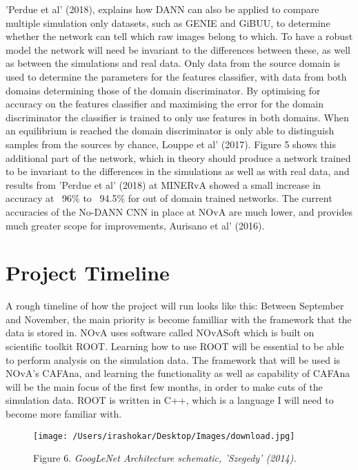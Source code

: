 \documentclass[11pt]{article}
\begin{document}
'Perdue et al' (2018), explains how DANN can also be applied to compare multiple simulation only datasets, such as GENIE and GiBUU, to determine whether the network can tell which raw images belong to which. To have a robust model the network will need be invariant to the differences between these, as well as between the simulations and real data. Only data from the source domain is used to determine the parameters for the features classifier, with data from both domains determining those of the domain discriminator. By optimising for accuracy on the features classifier and maximising the error for the domain discriminator the classifier is trained to only use features in both domains. When an equilibrium is reached the domain discriminator is only able to distinguish samples from the sources by chance, Louppe et al’ (2017). Figure 5 shows this additional part of the network, which in theory should produce a network trained to be invariant to the differences in the simulations as well as with real data, and results from 'Perdue et al' (2018) at MINERvA showed a small increase in accuracy at ~96\% to ~94.5\% for out of domain trained networks. The current accuracies of the No-DANN CNN in place at NOvA are much lower, and provides much greater scope for improvements, Aurisano et al' (2016). 


\section*{Project Timeline}

A rough timeline of how the project will run looks like this:
Between September and November, the main priority is become familliar with the framework that the data is stored in. NOvA uses software called NOvASoft which is built on scientific toolkit ROOT. Learning how to use ROOT will be essential to be able to perform analysis on the simulation data. The framework that will be used is NOvA’s CAFAna, and learning the functionality as well as capability of CAFAna will be the main focus of the first few months, in order to make cuts of the simulation data. ROOT is written in C++, which is a language I will need to become more familiar with. 

\begin{figure}[t]
 \centering
 \texttt{[image: /Users/irashokar/Desktop/Images/download.jpg]}
 
 Figure 6. \textit{GoogLeNet Architecture schematic, 'Szegedy' (2014).}
\end{figure}
\end{document}
